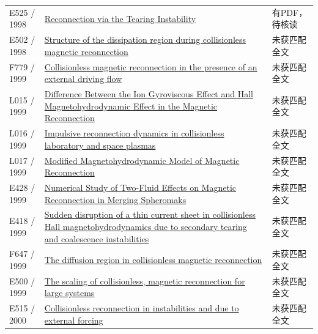 \begin{longtable}{P{24mm}P{97mm}P{27mm}}
E525 / 1998 & \href{https://doi.org/10.48550/arxiv.astro-ph/9804166}{Reconnection via the Tearing Instability} & 有PDF，待核读\\

E502 / 1998 & \href{https://doi.org/10.1029/97ja03528}{Structure of the dissipation region during collisionless magnetic reconnection} & 未获匹配全文\\

F779 / 1999 & \href{https://doi.org/10.1017/s0022377899007497}{Collisionless magnetic reconnection in the presence of an external driving flow} & 未获匹配全文\\

L015 / 1999 & \href{https://doi.org/10.1088/0256-307x/16/11/028}{Difference Between the Ion Gyroviscous Effect and Hall Magnetohydrodynamic Effect in the Magnetic Reconnection} & 未获匹配全文\\

L016 / 1999 & \href{https://doi.org/10.1029/1998ja900094}{Impulsive reconnection dynamics in collisionless laboratory and space plasmas} & 未获匹配全文\\

L017 / 1999 & \href{https://doi.org/10.1088/0256-307x/16/6/026}{Modified Magnetohydrodynamic Model of Magnetic Reconnection} & 未获匹配全文\\

E428 / 1999 & \href{https://ui.adsabs.harvard.edu/abs/1999APS..DPP.CP104B/abstract}{Numerical Study of Two-Fluid Effects on Magnetic Reconnection in Merging Spheromaks} & 未获匹配全文\\

E418 / 1999 & \href{https://doi.org/10.1029/1999gl003627}{Sudden disruption of a thin current sheet in collisionless Hall magnetohydrodynamics due to secondary tearing and coalescence instabilities} & 未获匹配全文\\

F647 / 1999 & \href{https://doi.org/10.1063/1.873436}{The diffusion region in collisionless magnetic reconnection} & 未获匹配全文\\

E500 / 1999 & \href{https://doi.org/10.1029/1999gl900481}{The scaling of collisionless,  magnetic reconnection for large systems} & 未获匹配全文\\

E515 / 2000 & \href{https://doi.org/10.1063/1.873822}{Collisionless reconnection in instabilities and due to external forcing} & 未获匹配全文\\


\end{longtable}

